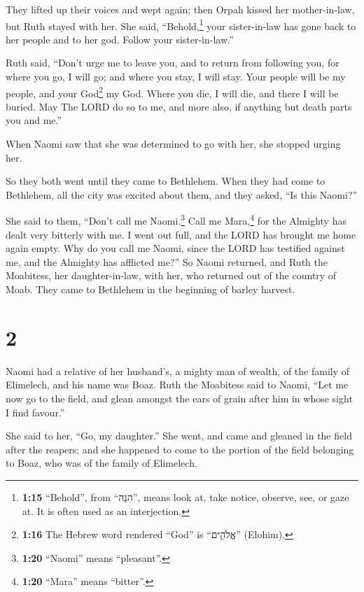  They lifted up their voices and wept again; then Orpah
kissed her mother-in-law, but Ruth stayed with her.  She
said, ``Behold,\footnote{\textbf{1:15} ``Behold'', from ``הִנֵּה'',
  means look at, take notice, observe, see, or gaze at. It is often used
  as an interjection.} your sister-in-law has gone back to her people
and to her god. Follow your sister-in-law.''

 Ruth said, ``Don't urge me to leave you, and to return
from following you, for where you go, I will go; and where you stay, I
will stay. Your people will be my people, and your God\footnote{\textbf{1:16}
  The Hebrew word rendered ``God'' is ``אֱלֹהִ֑ים'' (Elohim).} my God.
 Where you die, I will die, and there I will be buried.
May The LORD do so to me, and more also, if anything but death parts you
and me.''

 When Naomi saw that she was determined to go with her,
she stopped urging her.

 So they both went until they came to Bethlehem. When
they had come to Bethlehem, all the city was excited about them, and
they asked, ``Is this Naomi?''

 She said to them, ``Don't call me Naomi.\footnote{\textbf{1:20}
  ``Naomi'' means ``pleasant''.} Call me Mara,\footnote{\textbf{1:20}
  ``Mara'' means ``bitter''.} for the Almighty has dealt very bitterly
with me.  I went out full, and the LORD has brought me
home again empty. Why do you call me Naomi, since the LORD has testified
against me, and the Almighty has afflicted me?''  So
Naomi returned, and Ruth the Moabitess, her daughter-in-law, with her,
who returned out of the country of Moab. They came to Bethlehem in the
beginning of barley harvest.

\hypertarget{section-1}{%
\section{2}\label{section-1}}

 Naomi had a relative of her husband's, a mighty man of
wealth, of the family of Elimelech, and his name was Boaz.
 Ruth the Moabitess said to Naomi, ``Let me now go to the
field, and glean amongst the ears of grain after him in whose sight I
find favour.''

She said to her, ``Go, my daughter.''  She went, and came
and gleaned in the field after the reapers; and she happened to come to
the portion of the field belonging to Boaz, who was of the family of
Elimelech.

